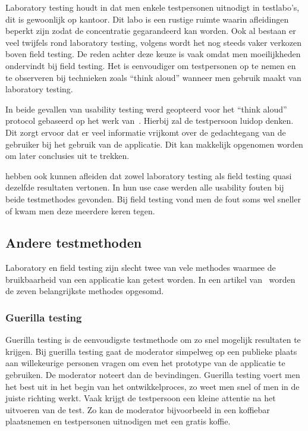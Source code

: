 Laboratory testing houdt in dat men enkele testpersonen uitnodigt in testlabo's, dit is gewoonlijk op kantoor. Dit labo is een rustige ruimte waarin afleidingen beperkt zijn zodat de concentratie gegarandeerd kan worden. Ook al bestaan er veel twijfels rond laboratory testing, volgens \textcite{Kjeldskov2003} wordt het nog steeds vaker verkozen boven field testing. De reden achter deze keuze is vaak omdat men moeilijkheden ondervindt bij field testing. Het is eenvoudiger om testpersonen op te nemen en te observeren bij technieken zoals ``think aloud'' wanneer men gebruik maakt van laboratory testing.

In beide gevallen van usability testing werd geopteerd voor het ``think aloud'' protocol gebaseerd op het werk van~\textcite{Ericsson1984}. Hierbij zal de testpersoon luidop denken. Dit zorgt ervoor dat er veel informatie vrijkomt over de gedachtegang van de gebruiker bij het gebruik van de applicatie. Dit kan makkelijk opgenomen worden om later conclusies uit te trekken.

\textcite{Kaikkonen2005} hebben ook kunnen afleiden dat zowel laboratory testing als field testing quasi dezelfde resultaten vertonen. In hun use case werden alle usability fouten bij beide testmethodes gevonden. Bij field testing vond men de fout soms wel sneller of kwam men deze meerdere keren tegen.

\subsection{Andere testmethoden}
\label{sec:usability-testing:testmethoden}

Laboratory en field testing zijn slecht twee van vele methodes waarmee de bruikbaarheid van een applicatie kan getest worden. In een artikel van~\textcite{Babich2019} worden de zeven belangrijkste methodes opgesomd.

\subsubsection{Guerilla testing}
\label{sec:usability-testing:testmethoden:guerilla}

Guerilla testing is de eenvoudigste testmethode om zo snel mogelijk resultaten te krijgen. Bij guerilla testing gaat de moderator simpelweg op een publieke plaats aan willekeurige personen vragen om even het prototype van de applicatie te gebruiken. De moderator noteert dan de bevindingen. Guerilla testing voert men het best uit in het begin van het ontwikkelproces, zo weet men snel of men in de juiste richting werkt. Vaak krijgt de testpersoon een kleine attentie na het uitvoeren van de test. Zo kan de moderator bijvoorbeeld in een koffiebar plaatsnemen en testpersonen uitnodigen met een gratis koffie.

